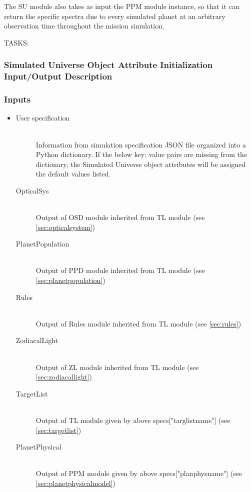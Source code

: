 \documentclass[cleanfoot]{asme2ej}
\begin{document}
The SU module also takes as input the PPM module instance, so that it can return the specific spectra due to every simulated planet at an arbitrary observation time throughout the mission simulation.

TASKS:
\label{sec:simulateduniverse}
\subsubsection{Simulated Universe Object Attribute Initialization Input/Output Description}
\subsubsection*{Inputs}
\begin{itemize}
    \item 
    \begin{description}
        \item[User specification] \hfill \\
        Information from simulation specification JSON file organized into a Python dictionary. If the below key: value pairs are missing from the dictionary, the Simulated Universe object attributes will be assigned the default values listed.
        \item[OpticalSys] \hfill \\
        Output of OSD module inherited from TL module (see \ref{sec:opticalsystem})
        \item[PlanetPopulation] \hfill \\
        Output of PPD module inherited from TL module (see \ref{sec:planetpopulation})
        \item[Rules] \hfill \\
        Output of Rules module inherited from TL module (see \ref{sec:rules})
        \item[ZodiacalLight] \hfill \\
        Output of ZL module inherited from TL module (see \ref{sec:zodiacallight})
        \item[TargetList] \hfill \\
        Output of TL module given by above specs["targlistname"] (see \ref{sec:targetlist})
        \item[PlanetPhysical] \hfill \\
        Output of PPM module given by above specs["planphysname"] (see \ref{sec:planetphysicalmodel})
    \end{description}
\end{itemize}
\end{document}
